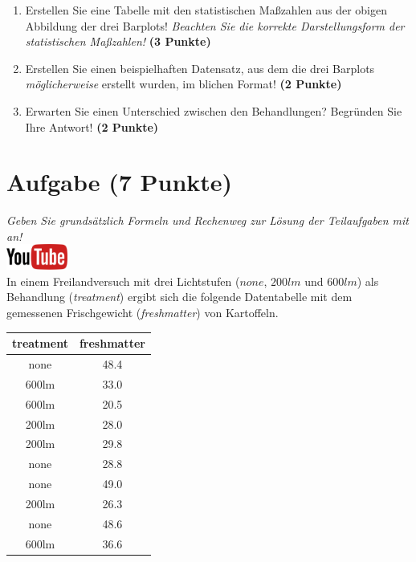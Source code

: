 \documentclass[a4paper, 9pt]{scrartcl}\usepackage[]{graphicx}\usepackage[]{xcolor}
\begin{document}
\begin{enumerate}
\item Erstellen Sie eine Tabelle mit den statistischen Ma{\ss}zahlen aus der
  obigen Abbildung der drei Barplots! \textit{Beachten Sie die korrekte
    Darstellungsform der statistischen Ma{\ss}zahlen!} \textbf{(3 Punkte)}
\item Erstellen Sie einen beispielhaften Datensatz, aus dem die drei
  Barplots \textit{m{\"o}glicherweise} erstellt wurden, im blichen Format! \textbf{(2 Punkte)}
\item Erwarten Sie einen Unterschied zwischen den Behandlungen? Begr{\"u}nden
  Sie Ihre Antwort! \textbf{(2 Punkte)}
\end{enumerate} 
\clearpage

\section{Aufgabe \hfill (7 Punkte)}

\textit{Geben Sie grunds{\"a}tzlich Formeln und Rechenweg zur L{\"o}sung der
  Teilaufgaben mit an!} \\[1Ex]

\hfill\href{https://youtu.be/vXnLttRL_VI}{\includegraphics[width =
  2cm]{img/youtube}}\\[1Ex]



In einem Freilandversuch mit drei Lichtstufen ($none$, $200lm$ und $600lm$) als Behandlung
(\textit{treatment}) ergibt sich die folgende Datentabelle mit dem
gemessenen Frischgewicht (\textit{freshmatter}) von Kartoffeln.

\begin{table}[!h]
\centering
\begin{tabular}{cc}
\toprule
treatment & freshmatter\\
\midrule
none & 48.4\\
600lm & 33.0\\
600lm & 20.5\\
200lm & 28.0\\
200lm & 29.8\\
\addlinespace
none & 28.8\\
none & 49.0\\
200lm & 26.3\\
none & 48.6\\
600lm & 36.6\\
\bottomrule
\end{tabular}
\end{table}
\end{document}
